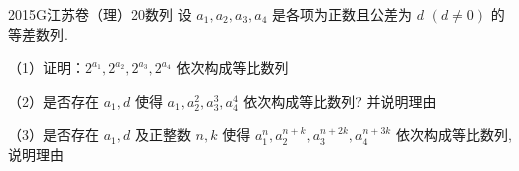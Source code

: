 
\begin{problem}{2015}{G}{江苏卷（理）}{20}{数列}
设 $a_1, a_2, a_3, a_4$ 是各项为正数且公差为 $d$ $(d \ne 0)$ 的等差数列.

（1）证明：$2^{a_1}, 2^{a_2}, 2^{a_3}, 2^{a_4}$ 依次构成等比数列

（2）是否存在 $a_1, d$ 使得 $a_1, a_2^2, a_3^3, a_4^4$ 依次构成等比数列? 并说明理由

（3）是否存在 $a_1, d$ 及正整数 $n, k$ 使得 $a_1^n, a_2^{n+k}, a_3^{n+2k}, a_4^{n+3k}$ 依次构成等比数列, 说明理由
\end{problem}